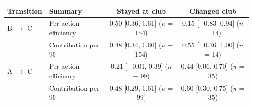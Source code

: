 \begin{tabular}{llcc}
\toprule
Transition & Summary & Stayed at club & Changed club \\
\midrule
B $\to$ C & Per-action efficiency & 0.50 [0.36, 0.61] ($n$ = 154) & 0.15 [$-$0.83, 0.94] ($n$ = 14) \\
 & Contribution per 90 & 0.48 [0.34, 0.60] ($n$ = 154) & 0.55 [$-$0.36, 1.00] ($n$ = 14) \\
\addlinespace
A $\to$ C & Per-action efficiency & 0.21 [$-$0.01, 0.39] ($n$ = 99) & 0.44 [0.06, 0.70] ($n$ = 35) \\
 & Contribution per 90 & 0.48 [0.29, 0.61] ($n$ = 99) & 0.60 [0.30, 0.75] ($n$ = 35) \\
\bottomrule
\end{tabular}

